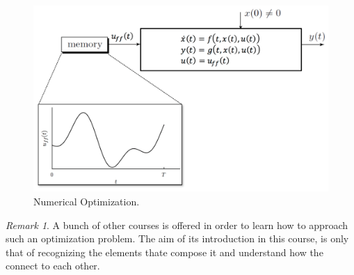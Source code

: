 \documentclass[a4paper,12 pt]{article}
\numberwithin{equation}{section}
\theoremstyle{definition}
\theoremstyle{remark}
\newtheorem*{bmk}{Remark}
\theoremstyle{definition}
\theoremstyle{definition}
\theoremstyle{definition}
\theoremstyle{remark}
\begin{document}
\begin{figure}[h]
\centering
\includegraphics[width=0.7\columnwidth]{numopt}
\caption{Numerical Optimization.}
\end{figure}
\begin{bmk}
A bunch of other courses is offered in order to learn how to approach such an optimization problem. The aim of its introduction in this course, is only that of recognizing the elements thate compose it and understand how the connect to each other.
\end{bmk}
\newpage
\end{document}
